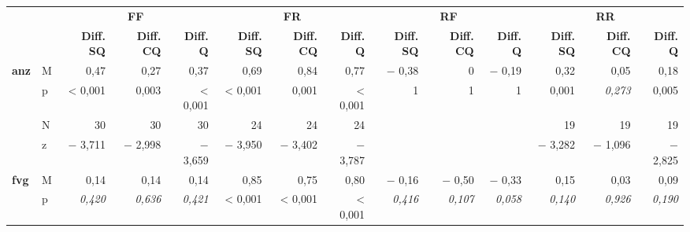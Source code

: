 \begin{sidewaystable}
\captionsetup{width=.9\textwidth}
\scriptsize
\begin{tabularx}{\textwidth}{llrrrrrrrrrrrr}
\lsptoprule

{} & & \multicolumn{3}{c}{ \textbf{FF}} & \multicolumn{3}{c}{ \textbf{FR}} & \multicolumn{3}{c}{ \textbf{RF}} & \multicolumn{3}{c}{ \textbf{RR}}\\
\cmidrule(lr){3-5}\cmidrule(lr){6-8}\cmidrule(lr){9-11}\cmidrule(lr){12-14}
{} & & \textbf{Diff. SQ}  & \textbf{Diff. CQ}  & \textbf{Diff. Q}  & \textbf{Diff. SQ}  & \textbf{Diff. CQ}  & \textbf{Diff. Q}  & \textbf{Diff. SQ}  & \textbf{Diff. CQ}  & \textbf{Diff. Q}  & \textbf{Diff. SQ}  & \textbf{Diff. CQ}  & \textbf{Diff. Q} \\
\midrule
\textbf{anz} & M & \cellcolor{lsLightGreen}0,47 & \cellcolor{lsLightGreen}0,27 & \cellcolor{lsLightGreen}0,37 & \cellcolor{lsLightGreen}0,69 & \cellcolor{lsLightGreen}0,84 & \cellcolor{lsLightGreen}0,77 & $-$ 0,38 & 0 & $-$ 0,19 & \cellcolor{lsLightGreen}0,32 & 0,05 & \cellcolor{lsLightGreen}0,18\\
& p & \cellcolor{lsLightGreen}< 0,001 & \cellcolor{lsLightGreen}0,003 & \cellcolor{lsLightGreen}< 0,001 & \cellcolor{lsLightGreen}< 0,001 & \cellcolor{lsLightGreen}0,001 & \cellcolor{lsLightGreen}< 0,001 & 1 & 1 & 1 & \cellcolor{lsLightGreen}0,001 & \textit{0,273} & \cellcolor{lsLightGreen}0,005\\
& N & \cellcolor{lsLightGreen}30 & \cellcolor{lsLightGreen}30 & \cellcolor{lsLightGreen}30 & \cellcolor{lsLightGreen}24 & \cellcolor{lsLightGreen}24 & \cellcolor{lsLightGreen}24 & & & & \cellcolor{lsLightGreen}19 & 19 & \cellcolor{lsLightGreen}19\\
& z & \cellcolor{lsLightGreen}$-$ 3,711 & \cellcolor{lsLightGreen}$-$ 2,998 & \cellcolor{lsLightGreen}$-$ 3,659 & \cellcolor{lsLightGreen}$-$ 3,950 & \cellcolor{lsLightGreen}$-$ 3,402 & \cellcolor{lsLightGreen}$-$ 3,787 & & & & \cellcolor{lsLightGreen}$-$ 3,282 & $-$ 1,096 & \cellcolor{lsLightGreen}$-$ 2,825\\
\textbf{fvg} & M & 0,14 & 0,14 & 0,14 & \cellcolor{lsLightGreen}0,85 & \cellcolor{lsLightGreen}0,75 & \cellcolor{lsLightGreen}0,80 & $-$ 0,16 & $-$ 0,50 & $-$ 0,33 & 0,15 & 0,03 & 0,09\\
& p & \textit{0,420} & \textit{0,636} & \textit{0,421} & \cellcolor{lsLightGreen}< 0,001  & \cellcolor{lsLightGreen}< 0,001 & \cellcolor{lsLightGreen}< 0,001 & \textit{0,416} &\textit{0,107} & \textit{0,058} & \textit{0,140} & \textit{0,926} & \textit{0,190}\\

\end{tabularx}
\end{sidewaystable}
